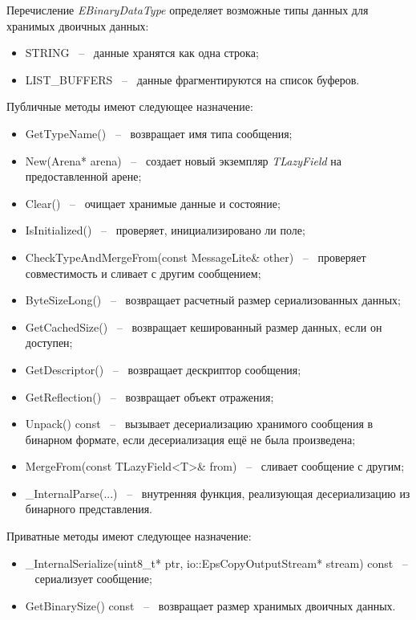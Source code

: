 \pagebreak
Перечисление \textit{EBinaryDataType} определяет возможные типы данных для хранимых двоичных данных:
\begin{itemize}
    \item STRING ~--~ данные хранятся как одна строка;
    \item LIST\_BUFFERS ~--~ данные фрагментируются на список буферов.
\end{itemize}

Публичные методы имеют следующее назначение:
\begin{itemize}
    \item GetTypeName() ~--~ возвращает имя типа сообщения;
    \item New(Arena* arena) ~--~ создает новый экземпляр \textit{TLazyField} на предоставленной арене;
    \item Clear() ~--~ очищает хранимые данные и состояние;
    \item IsInitialized() ~--~ проверяет, инициализировано ли поле;
    \item CheckTypeAndMergeFrom(const MessageLite\& other) ~--~ проверяет совместимость и сливает с другим сообщением;
    \item ByteSizeLong() ~--~ возвращает расчетный размер сериализованных данных;
    \item GetCachedSize() ~--~ возвращает кешированный размер данных, если он доступен;
    \item GetDescriptor() ~--~ возвращает дескриптор сообщения;
    \item GetReflection() ~--~ возвращает объект отражения;
    \item Unpack() const ~--~ вызывает десериализацию хранимого сообщения в бинарном формате, если десериализация ещё не была произведена;
    \item MergeFrom(const TLazyField<T>\& from) ~--~ сливает сообщение с другим;
    \item \_InternalParse(...) ~--~ внутренняя функция, реализующая десериализацию из бинарного представления.
\end{itemize}

Приватные методы имеют следующее назначение:

\begin{itemize}
    \item \_InternalSerialize(uint8\_t* ptr, io::EpsCopyOutputStream* stream) const ~--~ сериализует сообщение;
    \item GetBinarySize() const ~--~ возвращает размер хранимых двоичных данных.
\end{itemize}

